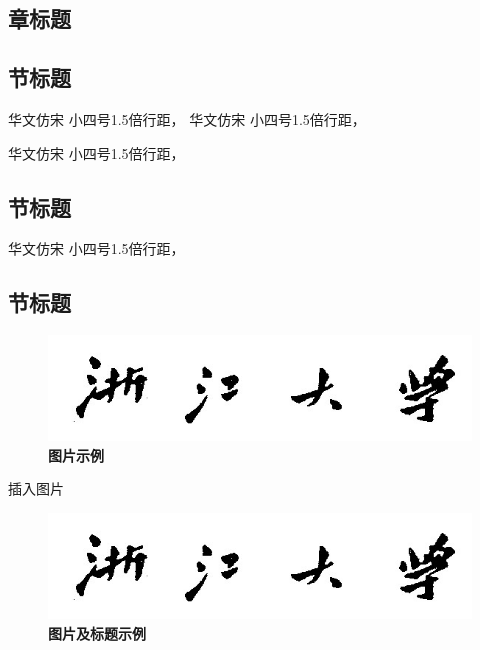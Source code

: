 \begin{spacing}{1.5}
{  \hwfs
    \section{章标题}
    \subsection{节标题}
    华文仿宋 小四号1.5倍行距，
    华文仿宋 小四号1.5倍行距，

    华文仿宋 小四号1.5倍行距，
    \subsection{节标题}
    
    华文仿宋 小四号1.5倍行距，
    \subsection{节标题}

    \begin{figure}[ht]
        \centering
        \includegraphics[scale=0.3]{pics/c1.jpg}
        \caption{  \bf 图片示例}   
        \label{123} %
        \vspace{0.3cm}
    \end{figure}


    

 
    插入图片
    \begin{figure}[ht]
        \centering
        \includegraphics[scale=0.6]{pics/c1.jpg}
        \caption{  \bf 图片及标题示例}    
        \vspace{0.4cm}
    \end{figure}
        
}
\end{spacing}
